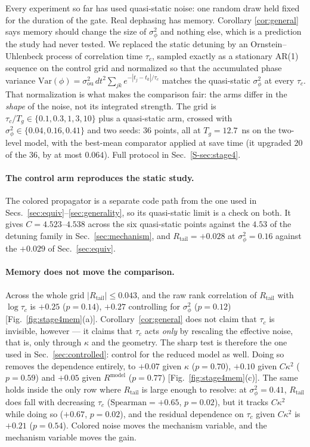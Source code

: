 \documentclass[aps,pra,twocolumn,superscriptaddress,reprint,nofootinbib,floatfix]{revtex4-2}
\theoremstyle{definition}
\newcommand{\Rt}{R_{\mathrm{tail}}}
\newcommand{\Rm}{R^{\mathrm{model}}}
\newcommand{\sref}[1]{Sec.~\ref{S-#1}}
\begin{document}
Every experiment so far has used quasi-static noise: one random draw held
fixed for the duration of the gate. Real dephasing has memory. Corollary
\ref{cor:general} says memory should change the size of $\sigma_\phi^2$ and
nothing else, which is a prediction the study had never tested. We replaced
the static detuning by an Ornstein--Uhlenbeck process of correlation time
$\tau_c$, sampled exactly as a stationary AR(1) sequence on the control grid
and normalized so that the accumulated phase variance
$\mathrm{Var}(\phi)=\sigma_{\mathrm{ou}}^2\,dt^2\sum_{jk}e^{-|t_j-t_k|/\tau_c}$
matches the quasi-static $\sigma_\phi^2$ at every $\tau_c$. That
normalization is what makes the comparison fair: the arms differ in the
\emph{shape} of the noise, not its integrated strength. The grid is
$\tau_c/T_g\in\{0.1,0.3,1,3,10\}$ plus a quasi-static arm, crossed with
$\sigma_\phi^2\in\{0.04,0.16,0.41\}$ and two seeds: $36$ points, all at
$T_g=12.7$~ns on the two-level model, with the best-mean comparator applied at
save time (it upgraded $20$ of the $36$, by at most $0.064$). Full protocol in
\sref{sec:stage4}.

\paragraph*{The control arm reproduces the static study.} The colored
propagator is a separate code path from the one used in
Secs.~\ref{sec:equiv}--\ref{sec:generality}, so its quasi-static limit is a
check on both. It gives $C=4.523$--$4.538$ across the six quasi-static points
against the $4.53$ of the detuning family in Sec.~\ref{sec:mechanism}, and
$\Rt=+0.028$ at $\sigma_\phi^2=0.16$ against the $+0.029$ of
Sec.~\ref{sec:equiv}.

\paragraph*{Memory does not move the comparison.} Across the whole grid
$|\Rt|\le0.043$, and the raw rank correlation of $\Rt$ with $\log\tau_c$ is
$+0.25$ ($p=0.14$), $+0.27$ controlling for $\sigma_\phi^2$ ($p=0.12$)
[Fig.~\ref{fig:stage4mem}(a)]. Corollary~\ref{cor:general} does not claim that
$\tau_c$ is invisible, however --- it claims that $\tau_c$ acts \emph{only} by
rescaling the effective noise, that is, only through $\kappa$ and the
geometry. The sharp test is therefore the one used in
Sec.~\ref{sec:controlled}: control for the reduced model as well. Doing so
removes the dependence entirely, to $+0.07$ given $\kappa$ ($p=0.70$),
$+0.10$ given $C\kappa^2$ ($p=0.59$) and $+0.05$ given $\Rm$ ($p=0.77$)
[Fig.~\ref{fig:stage4mem}(c)]. The same holds inside the only row where $\Rt$
is large enough to resolve: at $\sigma_\phi^2=0.41$, $\Rt$ does fall with
decreasing $\tau_c$ ($\mathrm{Spearman}=+0.65$, $p=0.02$), but it tracks
$C\kappa^2$ while doing so ($+0.67$, $p=0.02$), and the residual dependence on
$\tau_c$ given $C\kappa^2$ is $+0.21$ ($p=0.54$). Colored noise moves the
mechanism variable, and the mechanism variable moves the gain.
\end{document}
